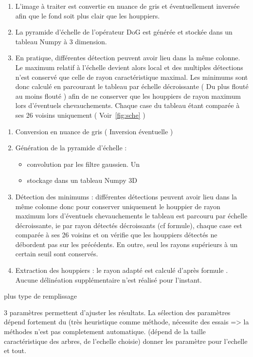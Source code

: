 \documentclass{article}
\begin{document}
	\begin{enumerate}
	\item L'image à traiter est convertie en nuance de gris et éventuellement inversée afin que le fond soit plus clair que les houppiers. 
	\item La pyramide d'échelle de l'opérateur DoG est générée et stockée dans un tableau Numpy à 3 dimension. 
	\item En pratique, différentes détection peuvent avoir lieu dans la même colonne. Le maximum relatif à l'échelle devient alors local et des multiples détections n'est conservé que celle de rayon caractéristique maximal. 
	Les minimums sont donc calculé en parcourant le tableau par échelle décroissante ( Du plus flouté au moins flouté ) afin de ne conserver que les houppiers de rayon maximum lors d'éventuels chevauchements. Chaque case du tableau étant comparée à ses 26 voisins uniquement ( Voir~\ref{fig:sche} ) 
	\end{enumerate}

	\begin{enumerate}
		\item Conversion en nuance de gris ( Inversion éventuelle ) 
		\item Génération de la pyramide d'échelle : 
		\begin{itemize}
			\item convolution par les filtre gaussien. Un  
			\item stockage dans un tableau Numpy 3D
		\end{itemize}
		\item Détection des minimums : différentes détections peuvent avoir lieu dans la même colonne donc pour conserver uniquement le houppier de rayon maximum lors d'éventuels chevauchements le tableau est parcouru par échelle décroissante, ie par rayon détectés décroissants (cf formule), chaque case est comparée à ses 26 voisins et on vérifie que les houppiers détectés ne débordent pas sur les précédents.  En outre, seul les rayons supérieurs à un certain seuil sont conservés.  
		\item Extraction des houppiers : le rayon adapté est calculé d'après formule . Aucune délinéation supplémentaire n'est réalisé pour l'instant. 
	\end{enumerate}	

	plus type de remplissage

	3 paramètres permettent d'ajuster les résultats. La sélection des paramètres dépend fortement du (très heuristique comme méthode, nécessite des essais => la méthodes n'est pas completement automatique. (dépend de la taille caractéristique des arbres, de l'echelle choisie) donner les paramètre pour l'echelle et tout.
\end{document}
